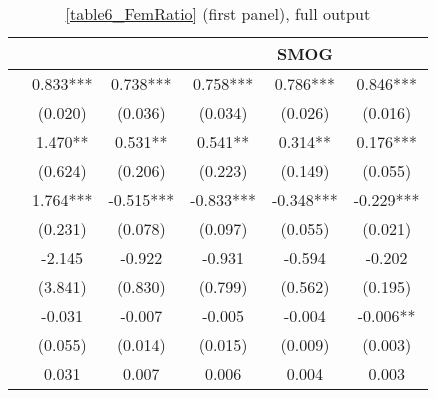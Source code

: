 \begin{table}
    \footnotesize
    \centering
    \begin{threeparttable}
        \caption{\autoref{table6_FemRatio} (first panel), full output}
        \label{table6_full}
        \begin{tabular}{p{3cm}S@{}S@{}S@{}S@{}S@{}}
            \toprule
            &{}&{}&{}&{SMOG}&{}\\
            \midrule
                    &       0.833***&       0.738***&       0.758***&       0.786***&       0.846***\\
                                          &     (0.020)   &     (0.036)   &     (0.034)   &     (0.026)   &     (0.016)   \\
                  &       1.470** &       0.531** &       0.541** &       0.314** &       0.176***\\
                                          &     (0.624)   &     (0.206)   &     (0.223)   &     (0.149)   &     (0.055)   \\
                  &       1.764***&      -0.515***&      -0.833***&      -0.348***&      -0.229***\\
                                          &     (0.231)   &     (0.078)   &     (0.097)   &     (0.055)   &     (0.021)   \\
            &      -2.145   &      -0.922   &      -0.931   &      -0.594   &      -0.202   \\
                                          &     (3.841)   &     (0.830)   &     (0.799)   &     (0.562)   &     (0.195)   \\
                    &      -0.031   &      -0.007   &      -0.005   &      -0.004   &      -0.006** \\
                                          &     (0.055)   &     (0.014)   &     (0.015)   &     (0.009)   &     (0.003)   \\
                    &       0.031   &       0.007   &       0.006   &       0.004   &       0.003   \\

\end{tabular}
\end{threeparttable}
\end{table}
